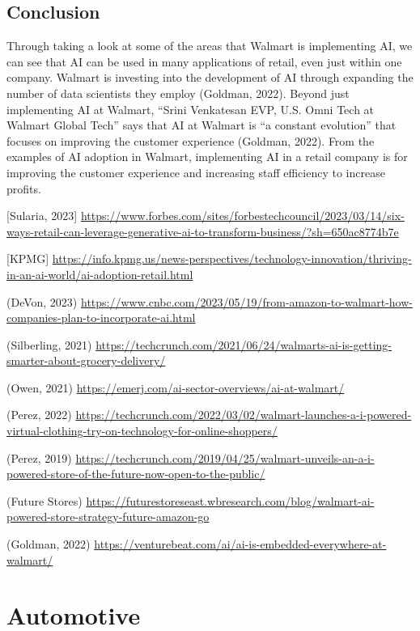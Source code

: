 \documentclass[
]{article}
\begin{document}
\hypertarget{conclusion}{%
\subsection{Conclusion}\label{conclusion}}

Through taking a look at some of the areas that Walmart is implementing AI, we can see that AI can be used in many applications of retail, even just within one company. Walmart is investing into the development of AI through expanding the number of data scientists they employ (Goldman, 2022). Beyond just implementing AI at Walmart, ``Srini Venkatesan EVP, U.S. Omni Tech at Walmart Global Tech'' says that AI at Walmart is ``a constant evolution'' that focuses on improving the customer experience (Goldman, 2022). From the examples of AI adoption in Walmart, implementing AI in a retail company is for improving the customer experience and increasing staff efficiency to increase profits.

{[}Sularia, 2023{]} \url{https://www.forbes.com/sites/forbestechcouncil/2023/03/14/six-ways-retail-can-leverage-generative-ai-to-transform-business/?sh=650ac8774b7e}

{[}KPMG{]} \url{https://info.kpmg.us/news-perspectives/technology-innovation/thriving-in-an-ai-world/ai-adoption-retail.html}

(DeVon, 2023) \url{https://www.cnbc.com/2023/05/19/from-amazon-to-walmart-how-companies-plan-to-incorporate-ai.html}

(Silberling, 2021) \url{https://techcrunch.com/2021/06/24/walmarts-ai-is-getting-smarter-about-grocery-delivery/}

(Owen, 2021) \url{https://emerj.com/ai-sector-overviews/ai-at-walmart/}

(Perez, 2022) \url{https://techcrunch.com/2022/03/02/walmart-launches-a-i-powered-virtual-clothing-try-on-technology-for-online-shoppers/}

(Perez, 2019) \url{https://techcrunch.com/2019/04/25/walmart-unveils-an-a-i-powered-store-of-the-future-now-open-to-the-public/}

(Future Stores)
\url{https://futurestoreseast.wbresearch.com/blog/walmart-ai-powered-store-strategy-future-amazon-go}

(Goldman, 2022) \url{https://venturebeat.com/ai/ai-is-embedded-everywhere-at-walmart/}

\hypertarget{automotive}{%
\section{Automotive}\label{automotive}}
\end{document}
